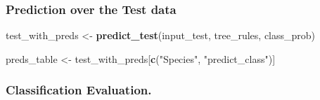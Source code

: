 \documentclass[a4paper,conference]{IEEEtran}
\newenvironment{Shaded}{\begin{snugshade}}{\end{snugshade}}
\newcommand{\AttributeTok}[1]{\textcolor[rgb]{0.13,0.29,0.53}{#1}}
\newcommand{\DecValTok}[1]{\textcolor[rgb]{0.00,0.00,0.81}{#1}}
\newcommand{\FunctionTok}[1]{\textcolor[rgb]{0.13,0.29,0.53}{\textbf{#1}}}
\newcommand{\NormalTok}[1]{#1}
\newcommand{\OtherTok}[1]{\textcolor[rgb]{0.56,0.35,0.01}{#1}}
\newcommand{\SpecialCharTok}[1]{\textcolor[rgb]{0.81,0.36,0.00}{\textbf{#1}}}
\newcommand{\StringTok}[1]{\textcolor[rgb]{0.31,0.60,0.02}{#1}}
\begin{document}
\begin{Shaded}
\end{Shaded}

\hypertarget{sec:prediction-over-the-test-data}{%
\subsubsection{Prediction over the Test
data}\label{sec:prediction-over-the-test-data}}

\begin{Shaded}
\begin{Highlighting}[]
\NormalTok{test\_with\_preds }\OtherTok{\textless{}{-}} \FunctionTok{predict\_test}\NormalTok{(input\_test,}
\NormalTok{                                tree\_rules,}
\NormalTok{                                class\_prob)}

\NormalTok{preds\_table }\OtherTok{\textless{}{-}}\NormalTok{ test\_with\_preds[}\FunctionTok{c}\NormalTok{(}\StringTok{"Species"}\NormalTok{,}
                              \StringTok{"predict\_class"}\NormalTok{)] }
\end{Highlighting}
\end{Shaded}

\hypertarget{sec:classification-evaluation.}{%
\subsubsection{Classification
Evaluation.}\label{sec:classification-evaluation.}}
\end{document}
